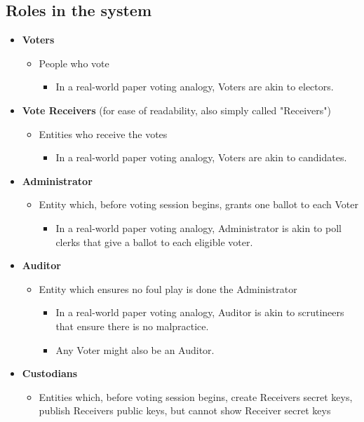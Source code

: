 \documentclass[10pt, letterpaper]{article}
\begin{document}
\subsection{Roles in the system}
\begin{itemize}
\item \textbf{Voters}
\begin{itemize}
\item People who vote
\begin{itemize}
\item In a real-world paper voting analogy, Voters are akin to electors.
\end{itemize}
\end{itemize}
\item \textbf{Vote Receivers} (for ease of readability, also simply called "Receivers")
\begin{itemize}
\item Entities who receive the votes
\begin{itemize}
\item In a real-world paper voting analogy, Voters are akin to candidates.
\end{itemize}
\end{itemize}
\item \textbf{Administrator}
\begin{itemize}
\item Entity which, before voting session begins, grants one ballot to each Voter
\begin{itemize}
\item In a real-world paper voting analogy, Administrator is akin to poll clerks that give a ballot to each eligible voter.
\end{itemize}
\end{itemize}
\item \textbf{Auditor}
\begin{itemize}
\item Entity which ensures no foul play is done the Administrator
\begin{itemize}
\item {In a real-world paper voting analogy, Auditor is akin to scrutineers that ensure there is no malpractice.}
\item {Any Voter might also be an Auditor.}
\end{itemize}
\end{itemize}
\item \textbf{Custodians}
\begin{itemize}
\item Entities which, before voting session begins, create Receivers secret keys, publish Receivers public keys, but cannot show Receiver secret keys

\end{itemize}
\end{itemize}
\end{document}
